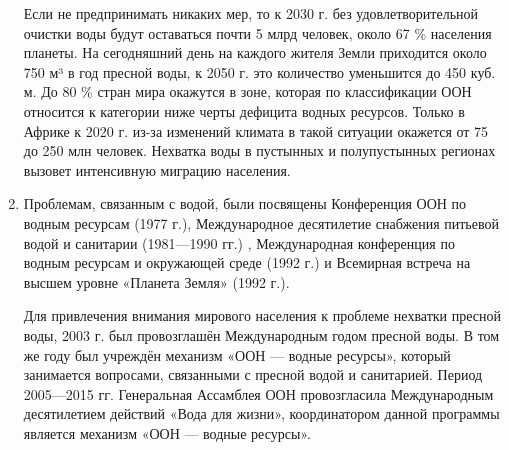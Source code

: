 \begin{enumerate}
		  Если не предпринимать никаких мер, то к 2030 г. без удовлетворительной очистки воды будут оставаться почти 5 млрд человек, около 67 \% населения планеты. На сегодняшний день на каждого жителя Земли приходится около 750 м³ в год пресной воды, к 2050 г. это количество уменьшится до 450 куб. м. До 80 \% стран мира окажутся в зоне, которая по классификации ООН относится к категории ниже черты дефицита водных ресурсов. Только в Африке к 2020 г. из-за изменений климата в такой ситуации окажется от 75 до 250 млн человек. Нехватка воды в пустынных и полупустынных регионах вызовет интенсивную миграцию населения.\cite {litlink4}
		  \item Проблемам, связанным с водой, были посвящены Конференция ООН по водным ресурсам (1977 г.), Международное десятилетие снабжения питьевой водой и санитарии (1981—1990 гг.) \cite{litlink5}, Международная конференция по водным ресурсам и окружающей среде (1992 г.) и Всемирная встреча на высшем уровне «Планета Земля» (1992 г.).
		  
		  Для привлечения внимания мирового населения к проблеме нехватки пресной воды, 2003 г. был провозглашён Международным годом пресной воды. В том же году был учреждён механизм «ООН — водные ресурсы», который занимается вопросами, связанными с пресной водой и санитарией. Период 2005—2015 гг. Генеральная Ассамблея ООН провозгласила Международным десятилетием действий «Вода для жизни», координатором данной программы является механизм «ООН — водные ресурсы».
		  

\end{enumerate}
